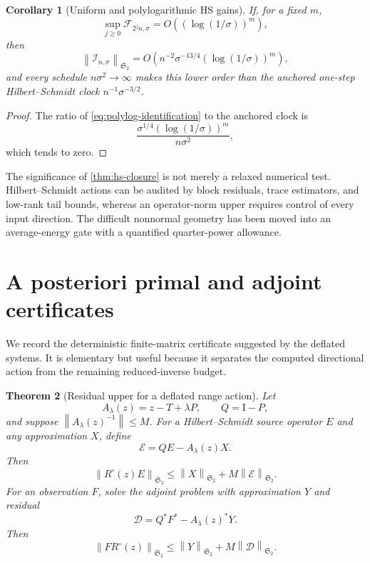 \documentclass[11pt]{article}
\newtheorem{theorem}{Theorem}[section]
\newtheorem{corollary}[theorem]{Corollary}
\theoremstyle{definition}
\theoremstyle{remark}
\newcommand{\Id}{\mathrm I}
\newcommand{\cF}{\mathcal F}
\newcommand{\cI}{\mathcal I}
\newcommand{\HS}{\mathfrak S_2}
\newcommand{\norm}[1]{\left\lVert #1\right\rVert}
\begin{document}
\begin{corollary}[Uniform and polylogarithmic HS gains]
\label{cor:polylog}
If, for a fixed \(m\),
\begin{equation}
 \sup_{j\ge0}\cF_{2^jn,\sigma}
 =O((\log(1/\sigma))^m),
 \label{eq:polylog-hs}
\end{equation}
then
\begin{equation}
 \norm{\cI_{n,\sigma}}_{\HS}
 =O\!\left(
 n^{-2}\sigma^{-13/4}(\log(1/\sigma))^m
 \right),
 \label{eq:polylog-identification}
\end{equation}
and every schedule \(n\sigma^2\to\infty\) makes this lower order than the
anchored one-step Hilbert--Schmidt clock
\(n^{-1}\sigma^{-3/2}\).
\end{corollary}

\begin{proof}
The ratio of \eqref{eq:polylog-identification} to the anchored clock is
\[
 \frac{\sigma^{1/4}(\log(1/\sigma))^m}{n\sigma^2},
\]
which tends to zero.
\end{proof}

The significance of \cref{thm:hs-closure} is not merely a relaxed numerical
test.  Hilbert--Schmidt actions can be audited by block residuals, trace
estimators, and low-rank tail bounds, whereas an operator-norm upper requires
control of every input direction.  The difficult nonnormal geometry has
been moved into an average-energy gate with a quantified quarter-power
allowance.

\section{A posteriori primal and adjoint certificates}
\label{sec:certificate}

We record the deterministic finite-matrix certificate suggested by the
deflated systems.  It is elementary but useful because it separates the
computed directional action from the remaining reduced-inverse budget.

\begin{theorem}[Residual upper for a deflated range action]
\label{thm:residual-upper}
Let
\[
 A_\lambda(z)=z-T+\lambda P,
 \qquad Q=\Id-P,
\]
and suppose \(\norm{A_\lambda(z)^{-1}}\le M\).  For a Hilbert--Schmidt source
operator \(E\) and any approximation \(X\), define
\[
 \mathcal E=QE-A_\lambda(z)X.
\]
Then
\begin{equation}
 \norm{R^\circ(z)E}_{\HS}
 \le\norm X_{\HS}+M\norm{\mathcal E}_{\HS}.
 \label{eq:residual-upper}
\end{equation}
For an observation \(F\), solve the adjoint problem with approximation
\(Y\) and residual
\[
 \mathcal D=Q^*F^*-A_\lambda(z)^*Y.
\]
Then
\begin{equation}
 \norm{FR^\circ(z)}_{\HS}
 \le\norm Y_{\HS}+M\norm{\mathcal D}_{\HS}.
 \label{eq:dual-residual-upper}
\end{equation}
\end{theorem}
\end{document}

